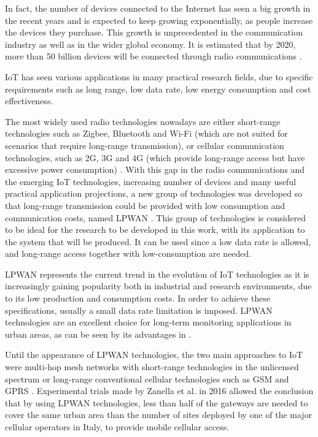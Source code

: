 In fact, the number of devices connected to the Internet has seen a big growth in the recent years and is expected to keep growing exponentially, as people increase the devices they purchase. This growth is unprecedented in the communication industry as well as in the wider global economy. It is estimated that by 2020, more than 50 billion devices will be connected through radio communications \cite{Holler2014}.

IoT has seen various applications in many practical research fields, due to specific requirements such as long range, low data rate, low energy consumption and cost effectiveness.

The most widely used radio technologies nowadays are either short-range technologies such as Zigbee, Bluetooth and Wi-Fi (which are not suited for scenarios that require long-range transmission), or cellular communication technologies, such as 2G, 3G and 4G (which provide long-range access but have excessive power consumption) \cite{Mekki2018}. With this gap in the radio communications and the emerging IoT technologies, increasing number of devices and many useful practical application projections, a new group of technologies was developed so that long-range transmission could be provided with low consumption and communication costs, named LPWAN \cite{Mekki2018}. This group of technologies is considered to be ideal for the research to be developed in this work, with its application to the system that will be produced. It can be used since a low data rate is allowed, and long-range access together with low-consumption are needed.

LPWAN represents the current trend in the evolution of IoT technologies as it is increasingly gaining popularity both in industrial and research environments, due to its low production and consumption costs. In order to achieve these specifications, usually a small data rate limitation is imposed. LPWAN technologies are an excellent choice for long-term monitoring applications in urban areas, as can be seen by its advantages in .

Until the appearance of LPWAN technologies, the two main approaches to IoT were multi-hop mesh networks with short-range technologies in the unlicensed spectrum or long-range conventional cellular technologies such as GSM and \ac{GPRS} \cite{Zanella2016}. Experimental trials made by Zanella et al. in 2016 allowed the conclusion that by using LPWAN technologies, less than half of the gateways are needed to cover the same urban area than the number of sites deployed by one of the major cellular operators in Italy, to provide mobile cellular access.

